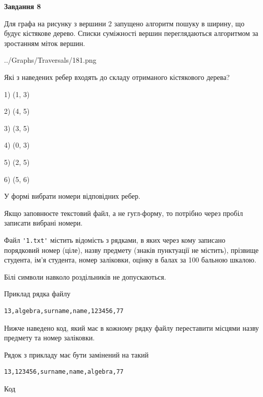 \documentclass[12pt, ukrainian]{article}
\def\code#1{\Verb!#1!}
\begin{document}
{\begin {large}
{\begin {center}\textbf{Завдання 8}\end {center}}\par
Для графа на рисунку з вершини 2 запущено алгоритм пошуку в ширину, що будує кістякове дерево. Списки суміжності вершин переглядаються алгоритмом за зростанням міток вершин.\par
\begin{center}
	{../Graphs/Traversals/181.png}
\end{center}
\par Які з наведених ребер входять до складу отриманого кістякового дерева?\par
1) (1, 3)\par
2) (4, 5)\par
3) (3, 5)\par
4) (0, 3)\par
5) (2, 5)\par
6) (5, 6)\par
{\vskip 15pt} У формі вибрати номери відповідних ребер.


Якщо заповнюєте текстовий файл, а не гугл-форму, то потрібно через пробіл записа\-ти вибрані номери.\par
\newpage


Файл \code{'1.txt'} містить відомість з рядками, в яких через кому записано поряд\-ковий номер (ціле), назву предмету (знаків пунктуації не містить), прізвище студента, ім'я студента, номер заліковки, оцінку в балах за 100 бальною шкалою.

Білі символи навколо роздільників не допускаються.

Приклад рядка файлу



\begin{verbatim}
13,algebra,surname,name,123456,77
\end{verbatim}


Нижче наведено код, який має в кожному рядку файлу переставити місцями назву предмету та номер заліковки.

Рядок з прикладу має бути замінений на такий



\begin{verbatim}
13,123456,surname,name,algebra,77
\end{verbatim}




Код




\end{large}}
\end{document}
